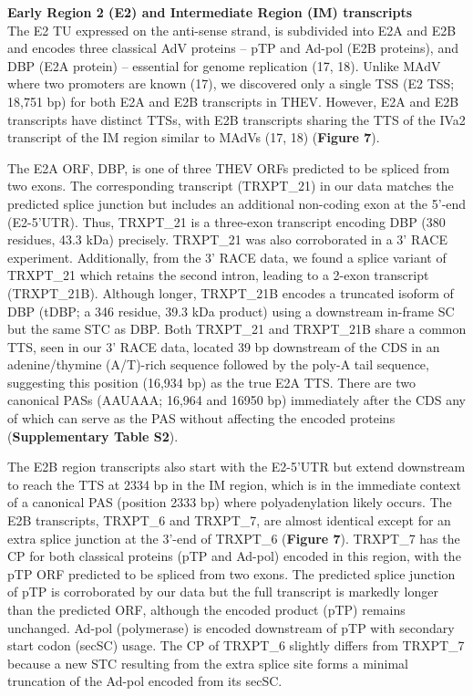 \documentclass[
]{article}
\begin{document}
\textbf{Early Region 2 (E2) and Intermediate Region (IM) transcripts}\\
The E2 TU expressed on the anti-sense strand, is subdivided into E2A and
E2B and encodes three classical AdV proteins -- pTP and Ad-pol (E2B
proteins), and DBP (E2A protein) -- essential for genome replication
(17, 18). Unlike MAdV where two promoters are known (17), we discovered
only a single TSS (E2 TSS; 18,751 bp) for both E2A and E2B transcripts
in THEV. However, E2A and E2B transcripts have distinct TTSs, with E2B
transcripts sharing the TTS of the IVa2 transcript of the IM region
similar to MAdVs (17, 18) (\textbf{Figure 7}).

The E2A ORF, DBP, is one of three THEV ORFs predicted to be spliced from
two exons. The corresponding transcript (TRXPT\_21) in our data matches
the predicted splice junction but includes an additional non-coding exon
at the 5'-end (E2-5'UTR). Thus, TRXPT\_21 is a three-exon transcript
encoding DBP (380 residues, 43.3 kDa) precisely. TRXPT\_21 was also
corroborated in a 3' RACE experiment. Additionally, from the 3' RACE
data, we found a splice variant of TRXPT\_21 which retains the second
intron, leading to a 2-exon transcript (TRXPT\_21B). Although longer,
TRXPT\_21B encodes a truncated isoform of DBP (tDBP; a 346 residue, 39.3
kDa product) using a downstream in-frame SC but the same STC as DBP.
Both TRXPT\_21 and TRXPT\_21B share a common TTS, seen in our 3' RACE
data, located 39 bp downstream of the CDS in an adenine/thymine
(A/T)-rich sequence followed by the poly-A tail sequence, suggesting
this position (16,934 bp) as the true E2A TTS. There are two canonical
PASs (AAUAAA; 16,964 and 16950 bp) immediately after the CDS any of
which can serve as the PAS without affecting the encoded proteins
(\textbf{Supplementary Table S2}).

The E2B region transcripts also start with the E2-5'UTR but extend
downstream to reach the TTS at 2334 bp in the IM region, which is in the
immediate context of a canonical PAS (position 2333 bp) where
polyadenylation likely occurs. The E2B transcripts, TRXPT\_6 and
TRXPT\_7, are almost identical except for an extra splice junction at
the 3'-end of TRXPT\_6 (\textbf{Figure 7}). TRXPT\_7 has the CP for both
classical proteins (pTP and Ad-pol) encoded in this region, with the pTP
ORF predicted to be spliced from two exons. The predicted splice
junction of pTP is corroborated by our data but the full transcript is
markedly longer than the predicted ORF, although the encoded product
(pTP) remains unchanged. Ad-pol (polymerase) is encoded downstream of
pTP with secondary start codon (secSC) usage. The CP of TRXPT\_6
slightly differs from TRXPT\_7 because a new STC resulting from the
extra splice site forms a minimal truncation of the Ad-pol encoded from
its secSC.
\end{document}
